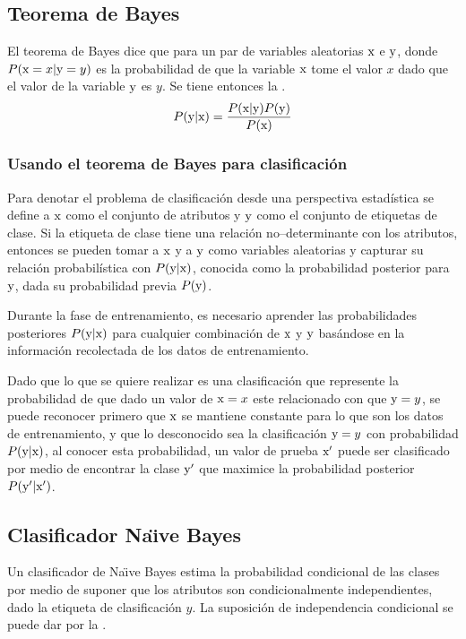 \subsection{Teorema de Bayes} \label{subsec:bayestheo}
El teorema de Bayes dice que para un par de variables aleatorias ${\textnormal{x}}$ e ${\textnormal{y}}$, donde $P({\textnormal{x}}=x | {\textnormal{y}}=y)$ es la probabilidad de que la variable ${\textnormal{x}}$ tome el valor $x$ dado que el valor de la variable ${\textnormal{y}}$ es $y$. Se tiene entonces la .
\begin{equation} \label{eq:bayestheo}
  P({\textnormal{y}} | {\textnormal{x}}) = \frac{P({\textnormal{x}} | {\textnormal{y}}) P({\textnormal{y}})}{P({\textnormal{x}})}
\end{equation}

\subsubsection{Usando el teorema de Bayes para clasificación}
Para denotar el problema de clasificación desde una perspectiva estadística se define a ${\textnormal{x}}$ como el conjunto de atributos y ${\textnormal{y}}$ como el conjunto de etiquetas de clase. Si la etiqueta de clase tiene una relación no--determinante con los atributos, entonces se pueden tomar a ${\textnormal{x}}$ y a ${\textnormal{y}}$ como variables aleatorias y capturar su relación probabilística con $P({\textnormal{y}}|{\textnormal{x}})$, conocida como la probabilidad posterior para ${\textnormal{y}}$, dada su probabilidad previa $P({\textnormal{y}})$.

Durante la fase de entrenamiento, es necesario aprender las probabilidades posteriores $P({\textnormal{y}}|{\textnormal{x}})$ para cualquier combinación de ${\textnormal{x}}$ y ${\textnormal{y}}$ basándose en la información recolectada de los datos de entrenamiento.

Dado que lo que se quiere realizar es una clasificación que represente la probabilidad de que dado un valor de ${\textnormal{x}}=x$ este relacionado con que ${\textnormal{y}}=y$, se puede reconocer primero que ${\textnormal{x}}$ se mantiene constante para lo que son los datos de entrenamiento, y que lo desconocido sea la clasificación ${\textnormal{y}}=y$ con probabilidad $P({\textnormal{y}}|{\textnormal{x}})$, al conocer esta probabilidad, un valor de prueba ${\textnormal{x}}'$ puede ser clasificado por medio de encontrar la clase ${\textnormal{y}}'$ que maximice la probabilidad posterior $P({\textnormal{y}}'|{\textnormal{x}}')$.


\subsection{Clasificador Na\"{\i}ve Bayes} \label{subsec:naivebayes}
Un clasificador de Na\"{\i}ve Bayes estima la probabilidad condicional de las clases por medio de suponer que los atributos son condicionalmente independientes, dado la etiqueta de clasificación $y$. La suposición de independencia condicional se puede dar por la .

